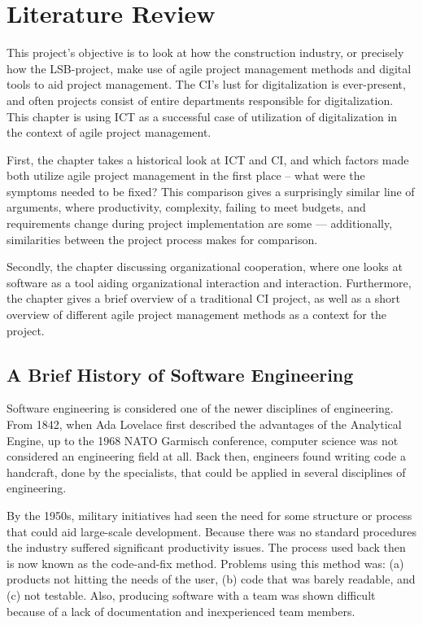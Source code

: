 
\chapter{Literature Review}
This project's objective is to look at how the construction industry, or precisely how the LSB-project, make use of agile project management methods and digital tools to aid project management. The CI's lust for digitalization is ever-present, and often projects consist of entire departments responsible for digitalization. This chapter is using ICT as a successful case of utilization of digitalization in the context of agile project management. 

First, the chapter takes a historical look at ICT and CI, and which factors made both utilize agile project management in the first place – what were the symptoms needed to be fixed? This comparison gives a surprisingly similar line of arguments, where productivity, complexity, failing to meet budgets, and requirements change during project implementation are some — additionally, similarities between the project process makes for comparison. 

Secondly, the chapter discussing organizational cooperation, where one looks at software as a tool aiding organizational interaction and interaction. Furthermore, the chapter gives a brief overview of a traditional CI project, as well as a short overview of different agile project management methods as a context for the project.

\section{A Brief History of Software Engineering} \label{sec:ICT_history}
Software engineering is considered one of the newer disciplines of engineering. From 1842, when Ada Lovelace first described the advantages of the Analytical Engine, up to the 1968 NATO Garmisch conference, computer science was not considered an engineering field at all. Back then, engineers found writing code a handcraft, done by the specialists, that could be applied in several disciplines of engineering. 

By the 1950s, military initiatives had seen the need for some structure or process that could aid large-scale development. Because there was no standard procedures the industry suffered significant productivity issues. The process used back then is now known as the code-and-fix method. Problems using this method was: (a) products not hitting the needs of the user, (b) code that was barely readable, and (c) not testable. Also, producing software with a team was shown difficult because of a lack of documentation and inexperienced team members. 


